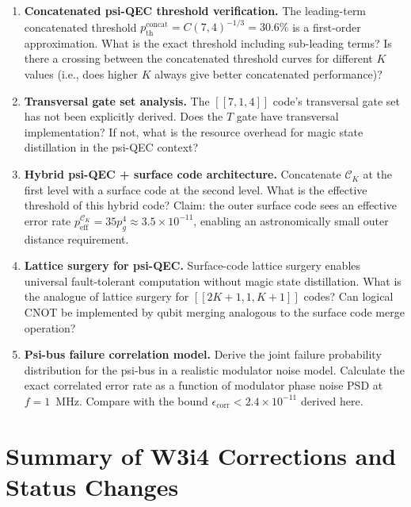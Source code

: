 \documentclass[11pt]{article}
\theoremstyle{definition}
\theoremstyle{remark}
\begin{document}
\begin{enumerate}

\item \textbf{Concatenated psi-QEC threshold verification.}
  The leading-term concatenated threshold $p_{\mathrm{th}}^{\mathrm{concat}} = C(7,4)^{-1/3} = 30.6\%$
  is a first-order approximation.  What is the exact threshold including
  sub-leading terms?  Is there a crossing between the concatenated threshold
  curves for different $K$ values (i.e., does higher $K$ always give better
  concatenated performance)?

\item \textbf{Transversal gate set analysis.}
  The $[[7,1,4]]$ code's transversal gate set has not been explicitly derived.
  Does the $T$ gate have transversal implementation?  If not, what is the
  resource overhead for magic state distillation in the psi-QEC context?

\item \textbf{Hybrid psi-QEC + surface code architecture.}
  Concatenate $\mathcal{C}_K$ at the first level with a surface code at the
  second level.  What is the effective threshold of this hybrid code?
  Claim: the outer surface code sees an effective error rate
  $p_{\mathrm{eff}}^{\mathcal{C}_K} = 35p_g^4 \approx 3.5\times10^{-11}$,
  enabling an astronomically small outer distance requirement.

\item \textbf{Lattice surgery for psi-QEC.}
  Surface-code lattice surgery enables universal fault-tolerant computation
  without magic state distillation.  What is the analogue of lattice surgery
  for $[[2K+1,1,K+1]]$ codes?  Can logical CNOT be implemented by qubit merging
  analogous to the surface code merge operation?

\item \textbf{Psi-bus failure correlation model.}
  Derive the joint failure probability distribution for the psi-bus in a
  realistic modulator noise model.  Calculate the exact correlated error rate
  as a function of modulator phase noise PSD at $f = 1$~MHz.  Compare with
  the bound $\epsilon_{\mathrm{corr}} < 2.4\times10^{-11}$ derived here.

\end{enumerate}

\section*{Summary of W3i4 Corrections and Status Changes}
\end{document}
